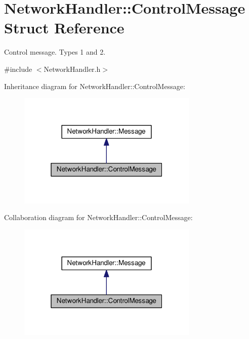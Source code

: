 \hypertarget{structNetworkHandler_1_1ControlMessage}{}\section{Network\+Handler\+:\+:Control\+Message Struct Reference}
\label{structNetworkHandler_1_1ControlMessage}


Control message. Types 1 and 2.  




{\ttfamily \#include $<$Network\+Handler.\+h$>$}



Inheritance diagram for Network\+Handler\+:\+:Control\+Message\+:\nopagebreak
\begin{figure}[H]
\begin{center}
\leavevmode
\includegraphics[width=244pt]{structNetworkHandler_1_1ControlMessage__inherit__graph}
\end{center}
\end{figure}


Collaboration diagram for Network\+Handler\+:\+:Control\+Message\+:\nopagebreak
\begin{figure}[H]
\begin{center}
\leavevmode
\includegraphics[width=244pt]{structNetworkHandler_1_1ControlMessage__coll__graph}
\end{center}
\end{figure}
